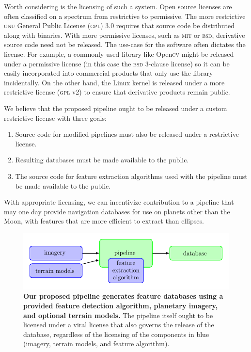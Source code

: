\documentclass[12pt]{article}
\begin{document}
Worth considering is the licensing of such a system. Open source licenses are often classified on a spectrum from restrictive to permissive. The more restrictive \textsc{gnu} General Public License (\textsc{gpl}) 3.0 requires that source code be distributed along with binaries. With more permissive licenses, such as \textsc{mit} or \textsc{bsd}, derivative source code need not be released. The use-case for the software often dictates the license. For example, a commonly used library like Open\textsc{cv} might be released under a permissive license (in this case the \textsc{bsd} 3-clause license) so it can be easily incorporated into commercial products that only use the library incidentally. On the other hand, the Linux kernel is released under a more restrictive license (\textsc{gpl} v2) to ensure that derivative products remain public.

We believe that the proposed pipeline ought to be released under a custom restrictive license with three goals:
\begin{enumerate}
\item Source code for modified pipelines must also be released under a restrictive license.
\item Resulting databases must be made available to the public.
\item The source code for feature extraction algorithms used with the pipeline must be made available to the public.
\end{enumerate}
With appropriate licensing, we can incentivize contribution to a pipeline that may one day provide navigation databases for use on planets other than the Moon, with features that are more efficient to extract than ellipses.


\begin{figure}
\center\includegraphics{flowchart.pdf}
\caption{\label{fig:flowchart}\textbf{Our proposed pipeline generates feature databases using a provided feature detection algorithm, planetary imagery, and optional terrain models.} The pipeline itself ought to be licensed under a viral license that also governs the release of the database, regardless of the licensing of the components in blue (imagery, terrain models, and feature algorithm).}
\end{figure}



\end{document}
